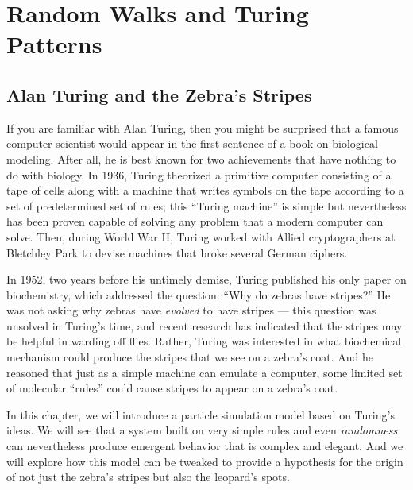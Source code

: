 \chapter[Random Walks and Turing Patterns]{Random Walks and Turing Patterns}
\label{chapter:turing}
\renewcommand{\chaptertitle}{Finding Motifs in Transcription Factor Networks}

\FloatBarrier

\section{Alan Turing and the Zebra’s Stripes}
\label{sec:introduction}

If you are familiar with Alan Turing, then you might be surprised that a famous computer scientist would appear in the first sentence of a book on biological modeling. After all, he is best known for two achievements that have nothing to do with biology. In 1936, Turing theorized a primitive computer consisting of a tape of cells along with a machine that writes symbols on the tape according to a set of predetermined set of rules; this ``Turing machine'' is simple but nevertheless has been proven capable of solving any problem that a modern computer can solve.  Then, during World War II, Turing worked with Allied cryptographers at Bletchley Park to devise machines that broke several German ciphers.

In 1952, two years before his untimely demise, Turing published his only paper on biochemistry, which addressed the question: “Why do zebras have stripes?” He was not asking why zebras have \textit{evolved} to have stripes --- this question was unsolved in Turing's time, and recent research has indicated that the stripes may be helpful in warding off flies. Rather, Turing was interested in what biochemical mechanism could produce the stripes that we see on a zebra's coat. And he reasoned that just as a simple machine can emulate a computer, some limited set of molecular ``rules'' could cause stripes to appear on a zebra's coat.

In this chapter, we will introduce a particle simulation model based on Turing's ideas. We will see that a system built on very simple rules and even \textit{randomness} can nevertheless produce emergent behavior that is complex and elegant. And we will explore how this model can be tweaked to provide a hypothesis for the origin of not just the zebra's stripes but also the leopard's spots.\\

